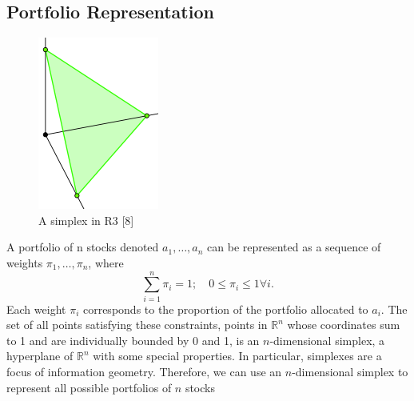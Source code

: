 \documentclass{article}
\begin{document}
\subsection{Portfolio Representation}
\begin{figure}
\includegraphics[scale=0.2]{simplex}
\caption{A simplex in R3 [8]}
\end{figure}
A portfolio of n stocks denoted $a_1 , \dots , a_n$ can be represented as a sequence of weights $\pi_1, \dots , \pi_n$, where
\begin{equation}
\sum_{i=1}^n \pi_i =1; \quad 0 \leq \pi_i \leq 1 \forall i.
\end{equation}
Each weight $\pi_i$ corresponds to the proportion of the portfolio allocated to $a_i$. The set of all points satisfying these constraints, points in $\mathbb{R}^n$ whose coordinates sum to 1 and are individually bounded by 0 and 1, is an $n$-dimensional simplex, a hyperplane of $\mathbb{R}^n$ with some
special properties. In particular, simplexes are a focus of information geometry. Therefore, we can use an $n$-dimensional simplex to represent all possible portfolios of $n$ stocks
\end{document}
